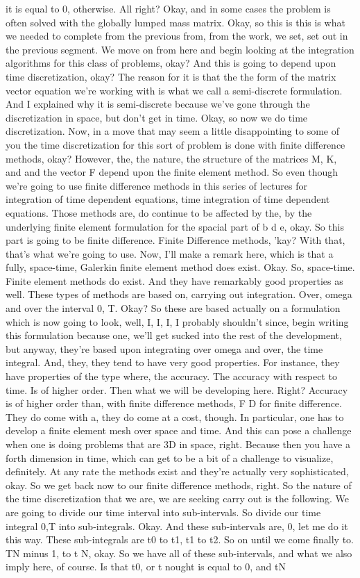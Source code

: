 \documentclass[10pt]{article}
\begin{document}
it is equal to 0, otherwise. All right? Okay, and in some cases the problem is often solved with the globally lumped mass matrix. Okay, so this is this is what we needed to complete from the previous from, from the work, we set, set out in the previous segment. We move on from here and begin looking at the integration algorithms for this class of problems, okay? And this is going to depend upon time discretization, okay? The reason for it is that the the form of the matrix vector equation we're working with is what we call a semi-discrete formulation. And I explained why it is semi-discrete because we've gone through the discretization in space, but don't get in time. Okay, so now we do time discretization. Now, in a move that may seem a little disappointing to some of you the time discretization for this sort of problem is done with finite difference methods, okay? However, the, the nature, the structure of the matrices M, K, and and the vector F depend upon the finite element method. So even though we're going to use finite difference methods in this series of lectures for integration of time dependent equations, time integration of time dependent equations. Those methods are, do continue to be affected by the, by the underlying finite element formulation for the spacial part of b d e, okay. So this part is going to be finite difference. Finite Difference methods, 'kay? With that, that's what we're going to use. Now, I'll make a remark here, which is that a fully, space-time, Galerkin finite element method does exist. Okay. So, space-time. Finite element methods do exist. And they have remarkably good properties as well. These types of methods are based on, carrying out integration. Over, omega and over the interval 0, T. Okay? So these are based actually on a formulation which is now going to look, well, I, I, I, I probably shouldn't since, begin writing this formulation because one, we'll get sucked into the rest of the development, but anyway, they're based upon integrating over omega and over, the time integral. And, they, they tend to have very good properties. For instance, they have properties of the type where, the accuracy. The accuracy with respect to time. Is of higher order. Then what we will be developing here. Right? Accuracy is of higher order than, with finite difference methods, F D for finite difference. They do come with a, they do come at a cost, though. In particular, one has to develop a finite element mesh over space and time. And this can pose a challenge when one is doing problems that are 3D in space, right. Because then you have a forth dimension in time, which can get to be a bit of a challenge to visualize, definitely. At any rate the methods exist and they're actually very sophisticated, okay. So we get back now to our finite difference methods, right. So the nature of the time discretization that we are, we are seeking carry out is the following. We are going to divide our time interval into sub-intervals. So divide our time integral 0,T into sub-integrals. Okay. And these sub-intervals are, 0, let me do it this way. These sub-integrals are t0 to t1, t1 to t2. So on until we come finally to. TN minus 1, to t N, okay. So we have all of these sub-intervals, and what we also imply here, of course. Is that t0, or t nought is equal to 0, and tN 
\end{document}
